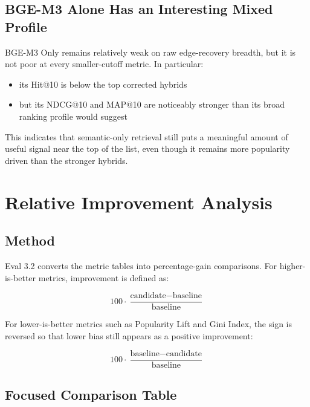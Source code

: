 \documentclass[11pt,a4paper]{article}
\begin{document}
\subsection{BGE-M3 Alone Has an Interesting Mixed Profile}
BGE-M3 Only remains relatively weak on raw edge-recovery breadth, but it is not
poor at every smaller-cutoff metric. In particular:

\begin{itemize}
    \item its Hit@10 is below the top corrected hybrids
    \item but its NDCG@10 and MAP@10 are noticeably stronger than its broad
          ranking profile would suggest
\end{itemize}

This indicates that semantic-only retrieval still puts a meaningful amount of
useful signal near the top of the list, even though it remains more popularity
driven than the stronger hybrids.

\section{Relative Improvement Analysis}

\subsection{Method}
Eval 3.2 converts the metric tables into percentage-gain comparisons. For
higher-is-better metrics, improvement is defined as:

\[
100 \cdot \frac{\text{candidate} - \text{baseline}}{\text{baseline}}
\]

For lower-is-better metrics such as Popularity Lift and Gini Index, the sign is
reversed so that lower bias still appears as a positive improvement:

\[
100 \cdot \frac{\text{baseline} - \text{candidate}}{\text{baseline}}
\]

\subsection{Focused Comparison Table}
\end{document}
